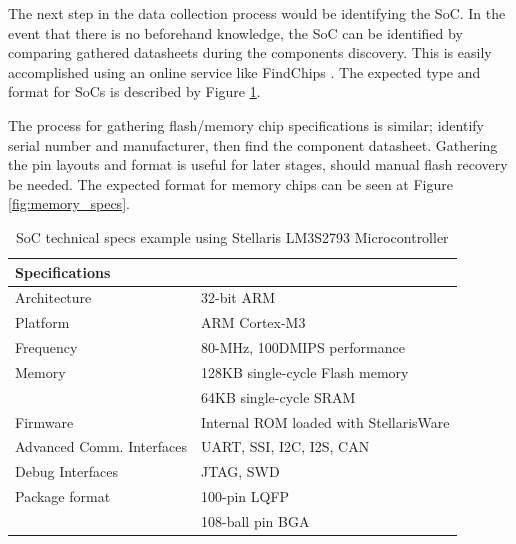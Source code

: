 

The next step in the data collection process would be identifying the SoC. In the event that there is no beforehand knowledge, the SoC can be identified by comparing gathered datasheets during the components discovery. This is easily accomplished using an online service like FindChips \autocite{FindchipsElectronicPart}. The expected type and format for SoCs is described by Figure \ref{fig:soc_specs}.

The process for gathering flash/memory chip specifications is similar; identify serial number and manufacturer, then find the component datasheet. Gathering the pin layouts and format is useful for later stages, should manual flash recovery be needed. The expected format for memory chips can be seen at Figure \ref{fig:memory_specs}.

\begin{table}[H]
  \centering
  \begin{tabular}{|p{6cm}|p{9cm}|}
    \hline\rowcolor{gray!30}

    \textbf{Specifications} &  \\
    \hline

    Architecture & 32-bit ARM \\
    \hline

    Platform & ARM Cortex-M3 \\
    \hline

    Frequency & 80-MHz, 100DMIPS performance \\
    \hline

    Memory & 128KB single-cycle Flash memory \\
     & 64KB single-cycle SRAM \\
    \hline

    Firmware & Internal ROM loaded with StellarisWare \\
    \hline

    Advanced Comm. Interfaces & UART, SSI, I2C, I2S, CAN \\
    \hline

    Debug Interfaces & JTAG, SWD \\
    \hline

    Package format & 100-pin LQFP \\
    & 108-ball pin BGA \\
    \hline

  \end{tabular}
  \caption{SoC technical specs example using Stellaris LM3S2793 Microcontroller}
  \label{fig:soc_specs}%
\end{table}

